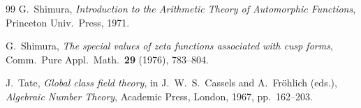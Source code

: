 \documentclass[11pt,a4paper]{amsart}
\theoremstyle{plain}
\theoremstyle{definition}
\begin{document}
\begin{thebibliography}{99}
G.~Shimura,
\emph{Introduction to the Arithmetic Theory of Automorphic Functions},
Princeton Univ.\ Press, 1971.

G.~Shimura,
\textit{The special values of zeta functions associated with cusp forms},
Comm.\ Pure Appl.\ Math.\ \textbf{29} (1976), 783--804.

J.~Tate,
\textit{Global class field theory},
in J.~W.~S.~Cassels and A.~Fr\"ohlich (eds.),
\emph{Algebraic Number Theory},
Academic Press, London, 1967, pp.~162--203.

\end{thebibliography}
\end{document}
